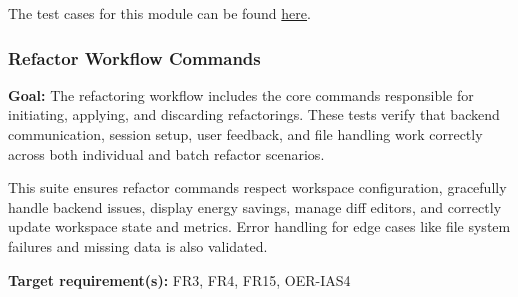 \documentclass[12pt, titlepage]{article}
\begin{document}
\noindent The test cases for this module can be found
\href{https://github.com/ssm-lab/capstone--sco-vs-code-plugin/blob/plugin-multi-file/test/commands/registerFilterSmellCommands.test.ts}{here}.

\subsubsection{Refactor Workflow Commands}

\textbf{Goal:} The refactoring workflow includes the core commands responsible for initiating, applying, and discarding refactorings. These tests verify that backend communication, session setup, user feedback, and file handling work correctly across both individual and batch refactor scenarios.

\medskip

\noindent This suite ensures refactor commands respect workspace configuration, gracefully handle backend issues, display energy savings, manage diff editors, and correctly update workspace state and metrics. Error handling for edge cases like file system failures and missing data is also validated.

\medskip

\noindent\textbf{Target requirement(s):} FR3, FR4, FR15, OER-IAS4~\cite{SRS} \\
\end{document}
